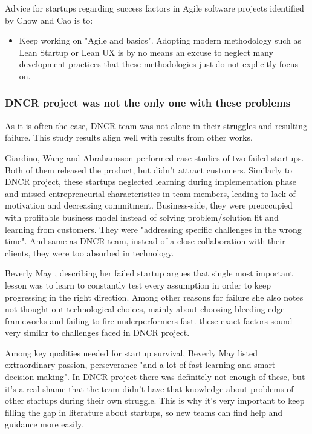\documentclass{article}
\begin{document}
Advice for startups regarding success factors in Agile software projects identified by Chow and Cao is to:
\begin{itemize}
\item Keep working on "Agile and basics". Adopting modern methodology such as Lean Startup or Lean UX is by no means an excuse to neglect many development practices that these methodologies just do not explicitly focus on.
\end{itemize}

\subsubsection{DNCR project was not the only one with these problems}
As it is often the case, DNCR team was not alone in their struggles and resulting failure. This study results align well with results from other works.

Giardino, Wang and Abrahamsson \citep{giardino2014early} performed case studies of two failed startups. Both of them released the product, but didn't attract customers. Similarly to DNCR project, these startups neglected learning during implementation phase and missed entrepreneurial characteristics in team members, leading to lack of motivation and decreasing commitment. Business-side, they were preoccupied with profitable business model instead of solving problem/solution fit and learning from customers. They were "addressing specific challenges in the wrong time". And same as DNCR team, instead of a close collaboration with their clients, they were too absorbed in technology.

Beverly May \citep{may2012applying}, describing her failed startup argues that single most important lesson was to learn to constantly test every assumption in order to keep progressing in the right direction. Among other reasons for failure she also notes not-thought-out technological choices, mainly about choosing bleeding-edge frameworks and failing to fire underperformers fast. these exact factors sound very similar to challenges faced in DNCR project.

Among key qualities needed for startup survival, Beverly May listed extraordinary passion, perseverance "and a lot of fast learning and smart decision-making". In DNCR project there was definitely not enough of these, but it's a real shame that the team didn't have that knowledge about problems of other startups during their own struggle. This is why it's very important to keep filling the gap in literature about startups, so new teams can find help and guidance more easily.
\end{document}

